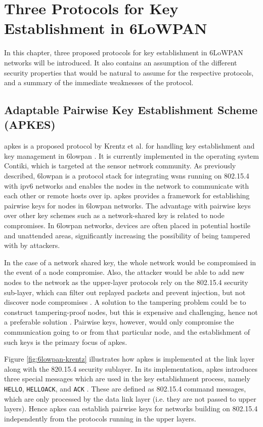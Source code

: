 \chapter{Three Protocols for Key Establishment in 6LoWPAN}
\label{chp:protocols}

In this chapter, three proposed protocols for key establishment in 6LoWPAN networks will be introduced. It also contains an assumption of the different security properties that would be natural to assume for the respective protocols, and a summary of the immediate weaknesses of the protocol.

\section{Adaptable Pairwise Key Establishment Scheme (APKES)}


\gls{apkes} is a proposed protocol by Krentz et al. for handling key establishment and key management in \gls{6lowpan} \cite{krentz20136lowpan}. It is currently implemented in the operating system Contiki, which is targeted at the sensor network community. As previously described, \gls{6lowpan} is a protocol stack for integrating \gls{wsn}s running on 802.15.4 with \gls{ip}v6 networks and enables the nodes in the network to communicate with each other or remote hosts over \gls{ip}. \gls{apkes} provides a framework for establishing pairwise keys for nodes in \gls{6lowpan} networks. The advantage with pairwise keys over other key schemes such as a network-shared key is related to node compromises. In \gls{6lowpan} networks, devices are often placed in potential hostile and unattended areas, significantly increasing the possibility of being tampered with by attackers.

In the case of a network shared key, the whole network would be compromised in the event of a node compromise. Also, the attacker would be able to add new nodes to the network as the upper-layer protocols rely on the 802.15.4 security sub-layer, which can filter out replayed packets and prevent injection, but not discover node compromises \cite{krentz20136lowpan}. A solution to the tampering problem could be to construct tampering-proof nodes, but this is expensive and challenging, hence not a preferable solution \cite{anderson1996tamper}. Pairwise keys, however, would only compromise the communication going to or from that particular node, and the establishment of such keys is the primary focus of \gls{apkes}.

Figure \ref{fig:6lowpan-krentz} illustrates how \gls{apkes} is implemented at the link layer along with the 820.15.4 security sublayer. In its implementation, \gls{apkes} introduces three special messages which are used in the key establishment process, namely \texttt{HELLO}, \texttt{HELLOACK}, and \texttt{ACK} \cite{krentz20136lowpan}. These are defined as 802.15.4 command messages, which are only processed by the data link layer (i.e. they are not passed to upper layers). Hence \gls{apkes} can establish pairwise keys for networks building on 802.15.4 independently from the protocols running in the upper layers.

